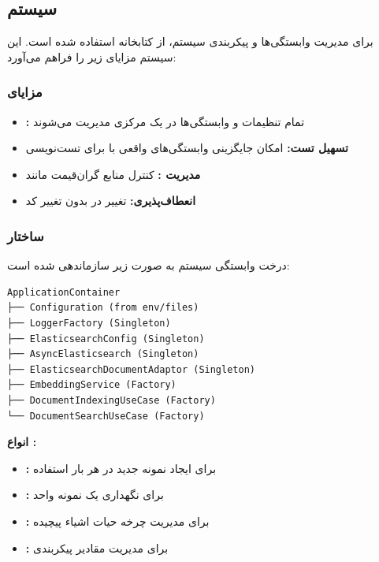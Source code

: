 \subsection{سیستم }

برای مدیریت وابستگی‌ها و پیکربندی سیستم، از کتابخانه  استفاده شده است. این سیستم مزایای زیر را فراهم می‌آورد:

\subsubsection{مزایای }

\begin{itemize}
    \item \textbf{:} تمام تنظیمات و وابستگی‌ها در یک  مرکزی مدیریت می‌شوند
    \item \textbf{تسهیل تست:} امکان جایگزینی وابستگی‌های واقعی با  برای تست‌نویسی
    \item \textbf{مدیریت :} کنترل  منابع گران‌قیمت مانند 
    \item \textbf{انعطاف‌پذیری:} تغییر  در  بدون تغییر کد
\end{itemize}

\subsubsection{ساختار }

درخت وابستگی سیستم به صورت زیر سازماندهی شده است:

\begin{verbatim}
ApplicationContainer
├── Configuration (from env/files)
├── LoggerFactory (Singleton)
├── ElasticsearchConfig (Singleton)
├── AsyncElasticsearch (Singleton)
├── ElasticsearchDocumentAdaptor (Singleton)
├── EmbeddingService (Factory)
├── DocumentIndexingUseCase (Factory)
└── DocumentSearchUseCase (Factory)
\end{verbatim}

\noindent
\textbf{انواع :}
\begin{itemize}
    \item \textbf{:} برای ایجاد نمونه جدید در هر بار استفاده
    \item \textbf{:} برای نگهداری یک نمونه واحد
    \item \textbf{:} برای مدیریت چرخه حیات اشیاء پیچیده
    \item \textbf{:} برای مدیریت مقادیر پیکربندی
\end{itemize}

